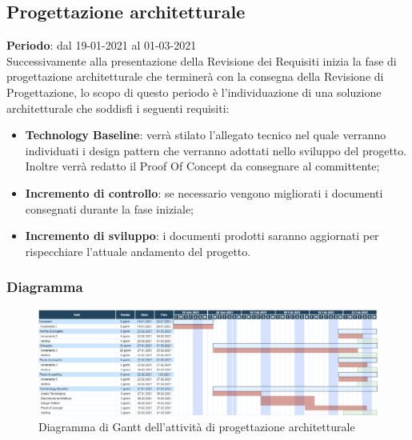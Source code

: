 	\subsection{Progettazione architetturale}
	\textbf{Periodo}: dal 19-01-2021 al 01-03-2021 \\
	Successivamente alla presentazione della Revisione dei Requisiti inizia la fase di progettazione architetturale che terminerà con la consegna della Revisione di Progettazione, lo scopo di questo periodo è l'individuazione di una soluzione architetturale che soddisfi i seguenti requisiti:
	\begin{itemize}
		\item \textbf{Technology Baseline}: verrà stilato l'allegato tecnico nel quale verranno individuati i design pattern che verranno adottati nello sviluppo del progetto. Inoltre verrà redatto il Proof Of Concept da consegnare al committente;
		\item \textbf{Incremento di controllo}: se necessario vengono migliorati i documenti consegnati durante la fase iniziale;
		\item \textbf{Incremento di sviluppo}: i documenti prodotti saranno aggiornati per rispecchiare l'attuale andamento del progetto.
	\end{itemize}
	
	\subsubsection{Diagramma}
		\begin{figure}[H]
        		\centering
        		\includegraphics[width=\textwidth]{source/img/Progettazione_architetturale.png}
        		\caption{Diagramma di Gantt dell'attività di progettazione architetturale}
    		\end{figure}

